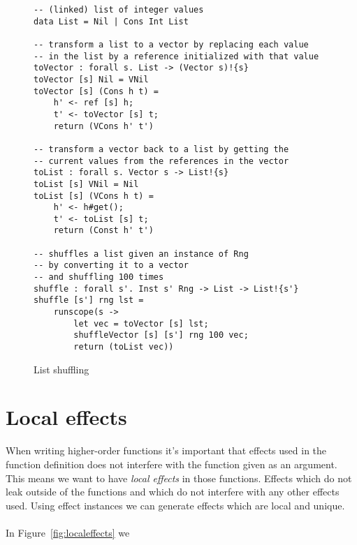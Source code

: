 \begin{figure}[h]
\caption{List shuffling}
\begin{verbatim}
-- (linked) list of integer values
data List = Nil | Cons Int List

-- transform a list to a vector by replacing each value
-- in the list by a reference initialized with that value
toVector : forall s. List -> (Vector s)!{s}
toVector [s] Nil = VNil
toVector [s] (Cons h t) =
	h' <- ref [s] h;
	t' <- toVector [s] t;
	return (VCons h' t')

-- transform a vector back to a list by getting the
-- current values from the references in the vector
toList : forall s. Vector s -> List!{s}
toList [s] VNil = Nil
toList [s] (VCons h t) =
	h' <- h#get();
	t' <- toList [s] t;
	return (Const h' t')

-- shuffles a list given an instance of Rng
-- by converting it to a vector
-- and shuffling 100 times
shuffle : forall s'. Inst s' Rng -> List -> List!{s'}
shuffle [s'] rng lst =
	runscope(s ->
		let vec = toVector [s] lst;
		shuffleVector [s] [s'] rng 100 vec;
		return (toList vec))
\end{verbatim}
\label{fig:listshuffle}
\end{figure}

\section{Local effects}
When writing higher-order functions it's important that effects used in the function definition does not interfere with the function given as an argument.
This means we want to have \emph{local effects} in those functions.
Effects which do not leak outside of the functions and which do not interfere with any other effects used.
Using effect instances we can generate effects which are local and unique.
\\\\
In Figure~\ref{fig:localeffects} we 

